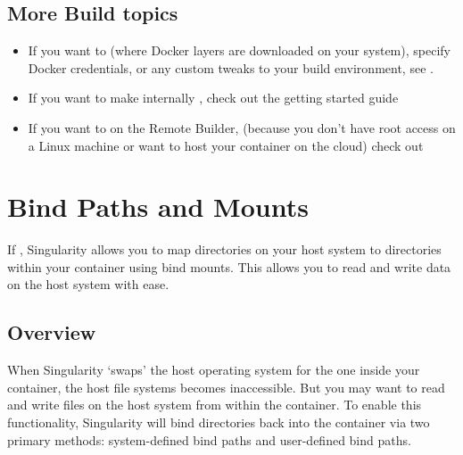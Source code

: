 \documentclass[letterpaper,10pt,english]{sphinxmanual}
\begin{document}
\section{More Build topics}
\label{\detokenize{build_a_container:more-build-topics}}\begin{itemize}
\item {} 
If you want to  (where Docker layers are
downloaded on your system), specify Docker credentials, or any custom tweaks
to your build environment, see .

\item {} 
If you want to make internally , check out the getting
started guide 

\item {} 
If you want to  on the Remote Builder, (because you
don’t have root access on a Linux machine or want to host your container on
the cloud) check out 

\end{itemize}


\chapter{Bind Paths and Mounts}
\label{\detokenize{bind_paths_and_mounts:bind-paths-and-mounts}}\label{\detokenize{bind_paths_and_mounts:id1}}\label{\detokenize{bind_paths_and_mounts::doc}}\label{\detokenize{bind_paths_and_mounts:sec-bindpaths}}
If ,
Singularity allows you to map directories on your host system to directories
within your container using bind mounts. This allows you to read and write data
on the host system with ease.


\section{Overview}
\label{\detokenize{bind_paths_and_mounts:overview}}
When Singularity ‘swaps’ the host operating system for the one inside your
container, the host file systems becomes inaccessible. But you may want to read
and write files on the host system from within the container. To enable this
functionality, Singularity will bind directories back into the container via two
primary methods: system-defined bind paths and user-defined bind paths.
\end{document}
